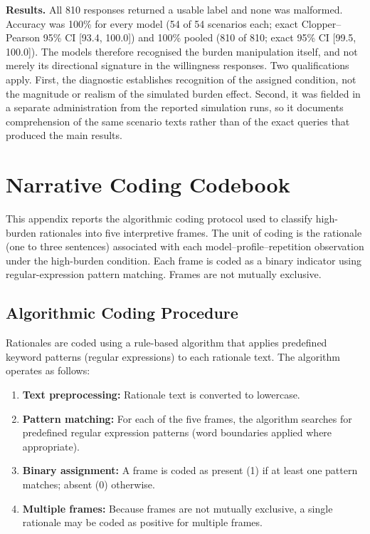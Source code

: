 \textbf{Results.} All 810 responses returned a usable label and none was malformed. Accuracy was 100\% for every model (54 of 54 scenarios each; exact Clopper--Pearson 95\% CI [93.4, 100.0]) and 100\% pooled (810 of 810; exact 95\% CI [99.5, 100.0]). The models therefore recognised the burden manipulation itself, and not merely its directional signature in the willingness responses. Two qualifications apply. First, the diagnostic establishes recognition of the assigned condition, not the magnitude or realism of the simulated burden effect. Second, it was fielded in a separate administration from the reported simulation runs, so it documents comprehension of the same scenario texts rather than of the exact queries that produced the main results.


\clearpage   %
\section{Narrative Coding Codebook}
\label{app:narrative-codebook}

This appendix reports the algorithmic coding protocol used to classify high-burden rationales into five interpretive frames. The unit of coding is the rationale (one to three sentences) associated with each model--profile--repetition observation under the high-burden condition. Each frame is coded as a binary indicator using regular-expression pattern matching. Frames are not mutually exclusive.

\subsection{Algorithmic Coding Procedure}

Rationales are coded using a rule-based algorithm that applies predefined keyword patterns (regular expressions) to each rationale text. The algorithm operates as follows:

\begin{enumerate}
\item \textbf{Text preprocessing:} Rationale text is converted to lowercase.
\item \textbf{Pattern matching:} For each of the five frames, the algorithm searches for predefined regular expression patterns (word boundaries applied where appropriate).
\item \textbf{Binary assignment:} A frame is coded as present (1) if at least one pattern matches; absent (0) otherwise.
\item \textbf{Multiple frames:} Because frames are not mutually exclusive, a single rationale may be coded as positive for multiple frames.
\end{enumerate}

